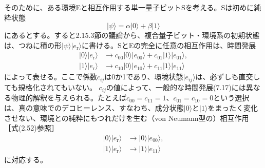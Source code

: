 そのために、ある環境Eと相互作用する単一量子ビットSを考える。Sは初めに純粋状態
\begin{equation}|\psi\rangle=\alpha|0\rangle+\beta|1\rangle\tag{7.16}\end{equation}
にあるとする。すると2.15.3節の議論から、複合量子ビット・環境系の初期状態は、つねに積の形$|\psi\rangle|e_{\mathrm r}\rangle$に書ける。SとEの完全に任意の相互作用は、時間発展
\begin{align}|0\rangle|e_{\mathrm r}\rangle&\longrightarrow c_{00}|0\rangle|e_{00}\rangle+c_{01}|1\rangle|e_{01}\rangle,\tag{7.17a}\\|1\rangle|e_{\mathrm r}\rangle&\longrightarrow c_{10}|0\rangle|e_{10}\rangle+c_{11}|1\rangle|e_{11}\rangle\tag{7.17b}\end{align}
によって表せる。ここで係数$c_{ij}$は0か1であり、環境状態$|e_{ij}\rangle$は、必ずしも直交しても規格化されてもいない。
\hypertarget{srcpage:308}{}\label{srcpage:308}
$c_{ij}$の値によって、一般的な時間発展(7.17)には異なる物理的解釈を与えられる。たとえば$c_{00}=c_{11}=1$、$c_{01}=c_{10}=0$という選択は、真の意味でのデコヒーレンス、すなわち、成分状態$|0\rangle$と$|1\rangle$をまったく変化させない、環境との純粋にもつれだけを生む（von Neumann型の）相互作用［式(2.52)参照］
\begin{align}|0\rangle|e_{\mathrm r}\rangle&\longrightarrow|0\rangle|e_{00}\rangle,\tag{7.18a}\\|1\rangle|e_{\mathrm r}\rangle&\longrightarrow|1\rangle|e_{11}\rangle\tag{7.18b}\end{align}
に対応する。


